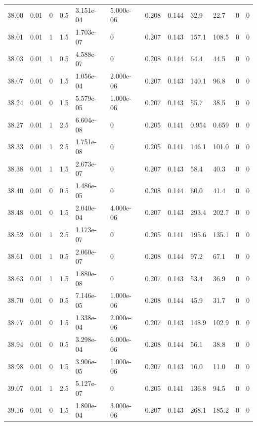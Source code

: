 \documentclass[preview]{standalone}
\begin{document}
{{{{{{{{{{{{\begin{tabular}{L{1.2cm}C{1.2cm} C{0.3cm}C{0.5cm} C{1.4cm}C{1.4cm} C{1.4cm}C{1.4cm} C{1.6cm}C{1.6cm} C{1.6cm}C{1.6cm}}
  38.00  &  0.01  & 0     & 0.5 &  3.151e-04  & 5.000e-06  &  0.208&   0.144& 32.9 & 22.7   &  0 & 0  \\ 
  38.01  &  0.01  & 1     & 1.5 &  1.703e-07  & 0  &  0.207&   0.143& 157.1 & 108.5   &  0 & 0  \\ 
  38.03  &  0.01  & 1     & 0.5 &  4.588e-07  & 0  &  0.208&   0.144& 64.4 & 44.5   &  0 & 0  \\ 
  38.07  &  0.01  & 0     & 1.5 &  1.056e-04  & 2.000e-06  &  0.207&   0.143& 140.1 & 96.8   &  0 & 0  \\ 
  38.24  &  0.01  & 0     & 1.5 &  5.579e-05  & 1.000e-06  &  0.207&   0.143& 55.7 & 38.5   &  0 & 0  \\ 
  38.27  &  0.01  & 1     & 2.5 &  6.604e-08  & 0  &  0.205&   0.141& 0.954 & 0.659   &  0 & 0  \\ 
  38.33  &  0.01  & 1     & 2.5 &  1.751e-08  & 0  &  0.205&   0.141& 146.1 & 101.0   &  0 & 0  \\ 
  38.38  &  0.01  & 1     & 1.5 &  2.673e-07  & 0  &  0.207&   0.143& 58.4 & 40.3   &  0 & 0  \\ 
  38.40  &  0.01  & 0     & 0.5 &  1.486e-05  & 0  &  0.208&   0.144& 60.0 & 41.4   &  0 & 0  \\ 
  38.48  &  0.01  & 0     & 1.5 &  2.040e-04  & 4.000e-06  &  0.207&   0.143& 293.4 & 202.7   &  0 & 0  \\ 
  38.52  &  0.01  & 1     & 2.5 &  1.173e-07  & 0  &  0.205&   0.141& 195.6 & 135.1   &  0 & 0  \\ 
  38.61  &  0.01  & 1     & 0.5 &  2.060e-07  & 0  &  0.208&   0.144& 97.2 & 67.1   &  0 & 0  \\ 
  38.63  &  0.01  & 1     & 1.5 &  1.880e-08  & 0  &  0.207&   0.143& 53.4 & 36.9   &  0 & 0  \\ 
  38.70  &  0.01  & 0     & 0.5 &  7.146e-05  & 1.000e-06  &  0.208&   0.144& 45.9 & 31.7   &  0 & 0  \\ 
  38.77  &  0.01  & 0     & 1.5 &  1.338e-04  & 2.000e-06  &  0.207&   0.143& 148.9 & 102.9   &  0 & 0  \\ 
  38.94  &  0.01  & 0     & 0.5 &  3.298e-04  & 6.000e-06  &  0.208&   0.144& 56.1 & 38.8   &  0 & 0  \\ 
  38.98  &  0.01  & 0     & 1.5 &  3.906e-05  & 1.000e-06  &  0.207&   0.143& 16.0 & 11.0   &  0 & 0  \\ 
  39.07  &  0.01  & 1     & 2.5 &  5.127e-07  & 0  &  0.205&   0.141& 136.8 & 94.5   &  0 & 0  \\ 
  39.16  &  0.01  & 0     & 1.5 &  1.800e-04  & 3.000e-06  &  0.207&   0.143& 268.1 & 185.2   &  0 & 0  \\ 

\end{tabular}}}}}}}}}}}}}
\end{document}
